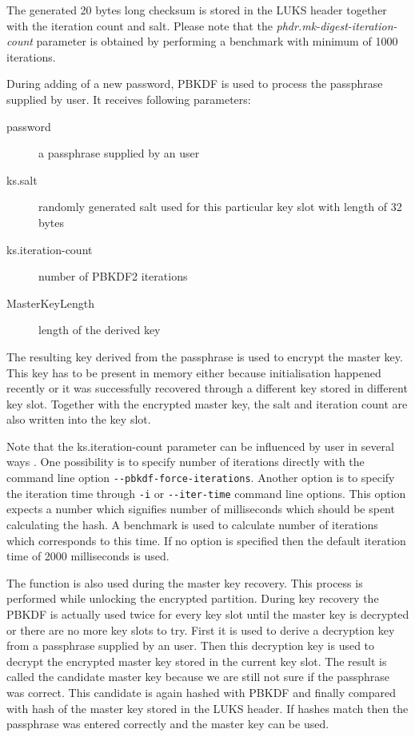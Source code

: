 \documentclass[nolof]{fithesis3}
\begin{document}
The generated 20 bytes long checksum is stored in the LUKS header together with the iteration count and salt. Please note that the \emph{phdr.mk-digest-iteration-count} parameter is obtained by performing a benchmark with minimum of 1000 iterations.

During adding of a new password, PBKDF is used to process the passphrase supplied by user. It receives following parameters:

\begin{description}
\item[password] a passphrase supplied by an user

\item[ks.salt] randomly generated salt used for this particular key slot with length of 32 bytes

\item[ks.iteration-count] number of PBKDF2 iterations

\item[MasterKeyLength] length of the derived key
\end{description}

The resulting key derived from the passphrase is used to encrypt the master key. This key has to be present in memory either because initialisation happened recently or it was successfully recovered through a different key stored in different key slot. Together with the encrypted master key, the salt and iteration count are also written into the key slot.

Note that the ks.iteration-count parameter can be influenced by user in several ways \parencite{cryptsetupmanual}. One possibility is to specify number of iterations directly with the command line option \verb+--pbkdf-force-iterations+. Another option is to specify the iteration time through \verb+-i+ or \verb+--iter-time+ command line options. This option expects a number which signifies number of milliseconds which should be spent calculating the hash. A benchmark is used to calculate number of iterations which corresponds to this time. If no option is specified then the default iteration time of 2000 milliseconds is used.

The function is also used during the master key recovery. This process is performed while unlocking the encrypted partition. During key recovery the PBKDF is actually used twice for every key slot until the master key is decrypted or there are no more key slots to try. First it is used to derive a decryption key from a passphrase supplied by an user. Then this decryption key is used to decrypt the encrypted master key stored in the current key slot. The result is called the candidate master key because we are still not sure if the passphrase was correct. This candidate is again hashed with PBKDF and finally compared with hash of the master key stored in the LUKS header. If hashes match then the passphrase was entered correctly and the master key can be used.
\end{document}
